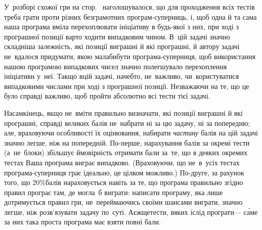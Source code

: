 У~розборі схожої гри на стор.~\pageref{text:random-in-simple-sticks-game} наголошувалося, що для проходження всіх тестів треба грати проти різних безграмотних програм-суперниць, і, щоб одна й та сама наша програма вміла перехоплювати ініціативу в будь-якої з них, при ході з програшної позиції варто ходити випадковим чином. В~цій задачі значно складніша залежність, які позиції виграшні й які програшні, й автору задачі не~вдалося придумати, якою мала\nolinebreak[3] би\nolinebreak[2] бути програма-суперниця, щоб використання нашою програмою випадкових чисел значно полегшувало перехоплення ініціативи у~неї. 
Так\nolinebreak[3] що в\nolinebreak[3] цій задачі, начебто, не~важливо, чи~користуватися випадковими числами при ході з програшної позиції. Незважаючи на те, що це було справді важливо, щоб пройти абсолютно всі тести тієї задачі.

Насамкінець, якщо не~вміти правильно визначати, які позиції виграшні й які програшні, справді великих балів не~набрати ні за цю задачу, ні за попередню; але, враховуючи особливості їх оцінювання, набирати \emph{частину} балів на цій задачі значно легше, ніж на попередній. По-перше, нарахування балів за окремі тести (а~не~блоки) збільшує ймовірність отримати бали за~те, що в деяких окремих тестах Ваша програма виграє випадково. (Враховуючи, що не~в~усіх тестах програма-суперниця грає ідеально, це цілком можливо.) По-друге, за рахунок того, що 20\%\nolinebreak[3] балів нараховується навіть за те, що програма правильно згідно правил програє там, де могла~б виграти: написати програму, яка лише дотримується правил гри, не~переймаючись своїми шансами виграти, значно легше, ніж розв'язувати задачу по~суті. А\nolinebreak[3] є\nolinebreak[3] ж\nolinebreak[2] ще\nolinebreak[2] тести, в\nolinebreak[3] яких і\nolinebreak[3] слід програти\nolinebreak[3] --- с\'{а}ме за них така проста програма має взяти повні бали.